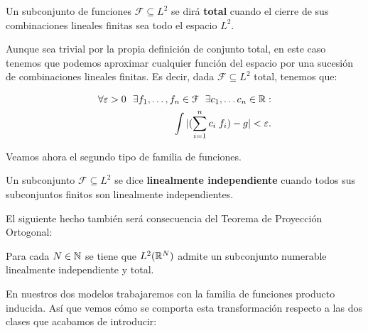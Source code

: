\begin{definicion}
    Un subconjunto de funciones $\mathcal{F} \subseteq L^2$ se dirá \textbf{total} cuando el cierre de sus combinaciones lineales finitas sea todo el espacio $L^2$.
\end{definicion}

\begin{observacion} Aunque sea trivial por la propia definición de conjunto total, en este caso tenemos que podemos aproximar cualquier función del espacio por una sucesión de combinaciones lineales finitas. Es decir, dada $\mathcal{F} \subseteq L^2$ total, tenemos que:

    \begin{equation} \label{eq:conjuntos_totales_epsilon_aproximacion}
        \begin{split}
            \forall \varepsilon > 0 \ \  \exists f_1, \ldots, f_n \in \mathcal{F} \ \  \exists c_1, \ldots c_n \in \mathbb{R}:\\
            \int | (\sum_{i = 1}^n c_i \; f_i) - g| < \varepsilon . \\
        \end{split}
    \end{equation}

\end{observacion}

Veamos ahora el segundo tipo de familia de funciones.

\begin{definicion}

    Un subconjunto $\mathcal{F} \subseteq L^2$ se dice \textbf{linealmente independiente} cuando todos sus subconjuntos finitos son linealmente independientes.

\end{definicion}

El siguiente hecho también será consecuencia del Teorema de Proyección Ortogonal:

\begin{proposicion}
    Para cada $N \in \mathbb{N}$ se tiene que $L^2(\mathbb{R}^N)$ admite un subconjunto numerable linealmente independiente y total.
\end{proposicion}

En nuestros dos modelos trabajaremos con la familia de funciones producto inducida. Así que vemos cómo se comporta esta transformación respecto a las dos clases que acabamos de introducir:

